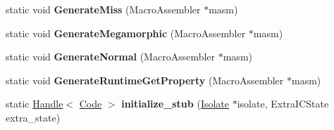 \begin{DoxyCompactItemize}
\item 
\hypertarget{classv8_1_1internal_1_1_load_i_c_ace4b24c3313ec0702f2e177db1bfee92}{}static void {\bfseries Generate\+Miss} (Macro\+Assembler $\ast$masm)\label{classv8_1_1internal_1_1_load_i_c_ace4b24c3313ec0702f2e177db1bfee92}

\item 
\hypertarget{classv8_1_1internal_1_1_load_i_c_a7605c8311ff812f723e5582d20e2987f}{}static void {\bfseries Generate\+Megamorphic} (Macro\+Assembler $\ast$masm)\label{classv8_1_1internal_1_1_load_i_c_a7605c8311ff812f723e5582d20e2987f}

\item 
\hypertarget{classv8_1_1internal_1_1_load_i_c_a283978f73ab60ad618873a3308d81817}{}static void {\bfseries Generate\+Normal} (Macro\+Assembler $\ast$masm)\label{classv8_1_1internal_1_1_load_i_c_a283978f73ab60ad618873a3308d81817}

\item 
\hypertarget{classv8_1_1internal_1_1_load_i_c_a524c61294db8703efaedb89710479fdc}{}static void {\bfseries Generate\+Runtime\+Get\+Property} (Macro\+Assembler $\ast$masm)\label{classv8_1_1internal_1_1_load_i_c_a524c61294db8703efaedb89710479fdc}

\item 
\hypertarget{classv8_1_1internal_1_1_load_i_c_a55e97ca8eeb2820894d14af4e4de6a7d}{}static \hyperlink{classv8_1_1internal_1_1_handle}{Handle}$<$ \hyperlink{classv8_1_1internal_1_1_code}{Code} $>$ {\bfseries initialize\+\_\+stub} (\hyperlink{classv8_1_1internal_1_1_isolate}{Isolate} $\ast$isolate, Extra\+I\+C\+State extra\+\_\+state)\label{classv8_1_1internal_1_1_load_i_c_a55e97ca8eeb2820894d14af4e4de6a7d}

\end{DoxyCompactItemize}
